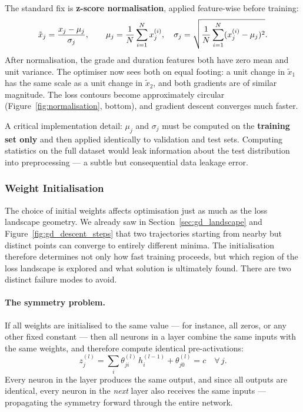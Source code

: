 The standard fix is \textbf{z-score normalisation}, applied feature-wise before training:
\begin{equation}
    \tilde{x}_j = \frac{x_j - \mu_j}{\sigma_j},
    \qquad
    \mu_j = \frac{1}{N}\sum_{i=1}^{N} x_j^{(i)},
    \quad
    \sigma_j = \sqrt{\frac{1}{N}\sum_{i=1}^{N} (x_j^{(i)} - \mu_j)^2}.
\end{equation}
After normalisation, the grade and duration features both have zero mean and unit variance. The optimiser now sees both on equal footing: a unit change in $\tilde{x}_1$ has the same scale as a unit change in $\tilde{x}_2$, and both gradients are of similar magnitude. The loss contours become approximately circular (Figure~\ref{fig:normalisation}, bottom), and gradient descent converges much faster.

A critical implementation detail: $\mu_j$ and $\sigma_j$ must be computed on the \textbf{training set only} and then applied identically to validation and test sets. Computing statistics on the full dataset would leak information about the test distribution into preprocessing — a subtle but consequential data leakage error.

\subsubsection{Weight Initialisation}\label{sec:initialization}

The choice of initial weights affects optimisation just as much as the loss landscape geometry. We already saw in Section~\ref{sec:gd_landscape} and Figure~\ref{fig:gd_descent_steps} that two trajectories starting from nearby but distinct points can converge to entirely different minima. The initialisation therefore determines not only how fast training proceeds, but which region of the loss landscape is explored and what solution is ultimately found. There are two distinct failure modes to avoid.

\paragraph{The symmetry problem.}
If all weights are initialised to the same value — for instance, all zeros, or any other fixed constant — then all neurons in a layer combine the same inputs with the same weights, and therefore compute identical pre-activations:
\begin{equation}
    z_j^{(l)} = \sum_i \theta_{ji}^{(l)}\, h_i^{(l-1)} + \theta_{j0}^{(l)} = c \quad \forall\, j.
\end{equation}
Every neuron in the layer produces the same output, and since all outputs are identical, every neuron in the \emph{next} layer also receives the same inputs — propagating the symmetry forward through the entire network.

